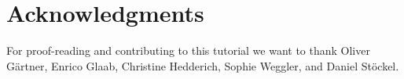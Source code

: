 \documentclass[12pt,twoside]{report}
\begin{document}
\chapter*{Acknowledgments}

For proof-reading and contributing to this tutorial we want to thank
Oliver G\"{a}rtner, Enrico Glaab, Christine Hedderich,
Sophie Weggler, and Daniel St\"{o}ckel.

\newpage
{}
\small
\printindex
\normalsize

\renewcommand{\bibname}{References}


\end{document}
